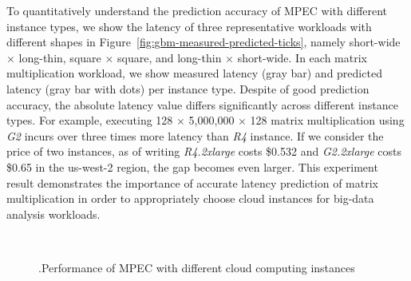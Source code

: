 \documentclass[10pt, conference, compsocconf]{IEEEtran}
\begin{document}
To quantitatively understand the prediction accuracy of MPEC with different instance types, we show the latency of three representative workloads with different shapes in Figure~\ref{fig:gbm-measured-predicted-ticks}, namely short-wide $\times$ long-thin, square $\times$ square, and long-thin $\times$ short-wide. In each matrix multiplication workload, we show measured latency (gray bar) and predicted latency (gray bar with dots) per instance type. Despite of good prediction accuracy, the absolute latency value differs significantly across different instance types. For example, executing 128 $\times$ 5,000,000 $\times$ 128 matrix multiplication using \textit{G2} incurs over three times more latency than \textit{R4} instance. If we consider the price of two instances, as of writing \textit{R4.2xlarge} costs \$0.532 and \textit{G2.2xlarge} costs \$0.65 in the us-west-2 region, the gap becomes even larger. This experiment result demonstrates the importance of accurate latency prediction of matrix multiplication in order to appropriately choose cloud instances for big-data analysis workloads.

\begin{figure}[t]
	\centering
	\\
	 \hfil
	\caption{\label{fig:gbm-comparison}.Performance of MPEC with different cloud computing instances}
\end{figure}
\end{document}
